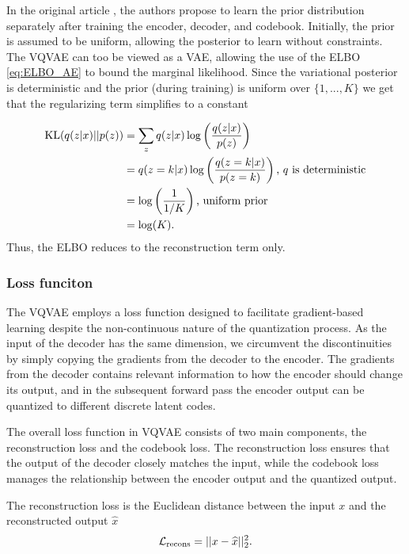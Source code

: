 \documentclass[../../thesis.tex]{subfiles}
\begin{document}
In the original article \cite{VQVAE}, the authors propose to learn the prior distribution separately after training the encoder, decoder, and codebook. Initially, the prior is assumed to be uniform, allowing the posterior to learn without constraints. The VQVAE can too be viewed as a VAE, allowing the use of the ELBO \ref{eq:ELBO_AE} to bound the marginal likelihood. Since the variational posterior is deterministic and the prior (during training) is uniform over $\{1,...,K\}$ we get that the regularizing term simplifies to a constant

\begin{equation}
    \begin{aligned}
        \operatorname*{\mathrm{KL}}(q(z|x)||p(z)) &= \sum_{z}  q(z|x) \log \left(\frac{q(z|x)}{p(z)}\right) \\
                           &= q(z=k|x) \log \left(\frac{q(z=k|x)}{p(z=k)}\right) \text{, $q$ is deterministic}\\
                           &= \log \left(\frac{1}{1/K}\right) \text{, uniform prior}\\
                           &= \log(K).
    \end{aligned}
\end{equation}
Thus, the ELBO reduces to the reconstruction term only.

\subsubsection{Loss funciton}
\label{section:VQVAELoss}
The VQVAE employs a loss function designed to facilitate gradient-based learning despite the non-continuous nature of the quantization process. As the input of the decoder has the same dimension, we circumvent the discontinuities by simply copying the gradients from the decoder to the encoder. The gradients from the decoder contains relevant information to how the encoder should change its output, and in the subsequent forward pass the encoder output can be quantized to different discrete latent codes.\newline


The overall loss function in VQVAE consists of two main components, the reconstruction loss and the codebook loss. The reconstruction loss ensures that the output of the decoder closely matches the input, while the codebook loss manages the relationship between the encoder output and the quantized output.\newline

The reconstruction loss is the Euclidean distance between the input $x$ and the reconstructed output $\widehat{x}$
\begin{equation}
    \mathcal{L}_{\text{recons}} = ||x - \widehat{x}||_2^2.
\end{equation}
\end{document}
